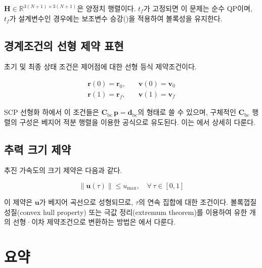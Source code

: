 \documentclass[11pt]{article}
\begin{document}
$\mathbf{H} \in \mathbb{R}^{3(N+1)\times 3(N+1)}$은 양정치 행렬이다.
$t_f$가 고정되면 이 문제는 순수 QP이며,
$t_f$가 설계변수인 경우에는 보조변수 승강(\cite{report007})을 적용하여 볼록성을 유지한다.

\subsection{경계조건의 선형 제약 표현}

초기 및 최종 상태 조건은 제어점에 대한 선형 등식 제약조건이다.

\begin{align}
  \mathbf{r}(0) = \mathbf{r}_0, &\quad \mathbf{v}(0) = \mathbf{v}_0 \label{eq:ic}\\
  \mathbf{r}(1) = \mathbf{r}_f, &\quad \mathbf{v}(1) = \mathbf{v}_f \label{eq:tc}
\end{align}

SCP 선형화 하에서 이 조건들은
$\mathbf{C}_\mathrm{bc}\,\mathbf{p} = \mathbf{d}_\mathrm{bc}$의 형태로 쓸 수 있으며,
구체적인 $\mathbf{C}_\mathrm{bc}$ 행렬의 구성은 베지어 적분 행렬을 이용한 공식으로 유도된다.
이는 \cite{report004}에서 상세히 다룬다.

\subsection{추력 크기 제약}

추진 가속도의 크기 제약은 다음과 같다.

\begin{equation}
  \|\mathbf{u}(\tau)\| \leq u_\mathrm{max}, \quad \forall\, \tau \in [0,1]
  \label{eq:thrust_limit}
\end{equation}

이 제약은 $\mathbf{u}$가 베지어 곡선으로 성형되므로, $\tau$의 연속 집합에 대한 조건이다.
볼록껍질 성질(convex hull property) 또는 극값 정리(extremum theorem)를 이용하여
유한 개의 선형·이차 제약조건으로 변환하는 방법은 \cite{report005}에서 다룬다.

\section{요약}
\end{document}
